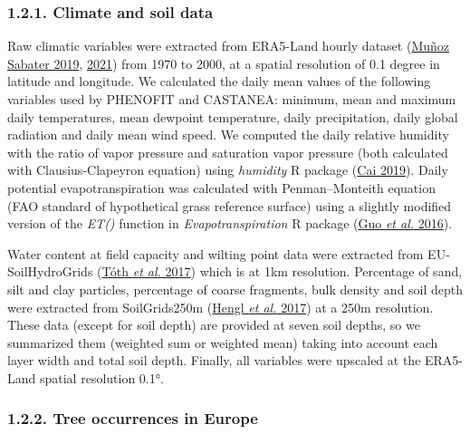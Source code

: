 \documentclass[11pt,]{article}
\begin{document}
\hypertarget{climatedata}{%
\subsubsection{1.2.1. Climate and soil data}\label{climatedata}}

Raw climatic variables were extracted from ERA5-Land hourly dataset
(\protect\hyperlink{ref-Sabater2019}{Muñoz Sabater 2019},
\protect\hyperlink{ref-Sabater2021}{2021}) from 1970 to 2000, at a
spatial resolution of 0.1 degree in latitude and longitude. We
calculated the daily mean values of the following variables used by
PHENOFIT and CASTANEA: minimum, mean and maximum daily temperatures,
mean dewpoint temperature, daily precipitation, daily global radiation
and daily mean wind speed. We computed the daily relative humidity with
the ratio of vapor pressure and saturation vapor pressure (both
calculated with Clausius-Clapeyron equation) using \emph{humidity} R
package (\protect\hyperlink{ref-Cai2019}{Cai 2019}). Daily potential
evapotranspiration was calculated with Penman--Monteith equation (FAO
standard of hypothetical grass reference surface) using a slightly
modified version of the \emph{ET()} function in
\emph{Evapotranspiration} R package (\protect\hyperlink{ref-Guo2016}{Guo
\emph{et al.} 2016}).

Water content at field capacity and wilting point data were extracted
from EU-SoilHydroGrids (\protect\hyperlink{ref-Toth2017}{Tóth \emph{et
al.} 2017}) which is at 1km resolution. Percentage of sand, silt and
clay particles, percentage of coarse fragments, bulk density and soil
depth were extracted from SoilGrids250m
(\protect\hyperlink{ref-Hengl2017}{Hengl \emph{et al.} 2017}) at a 250m
resolution. These data (except for soil depth) are provided at seven
soil depths, so we summarized them (weighted sum or weighted mean)
taking into account each layer width and total soil depth. Finally, all
variables were upscaled at the ERA5-Land spatial resolution 0.1°.

\hypertarget{occurrencedata}{%
\subsubsection{1.2.2. Tree occurrences in Europe}\label{occurrencedata}}
\end{document}
